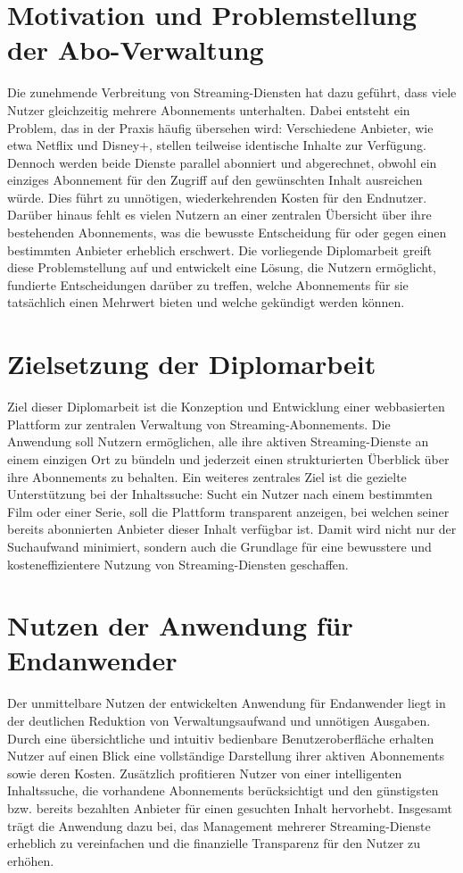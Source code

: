 \section{Motivation und Problemstellung der Abo-Verwaltung}

Die zunehmende Verbreitung von Streaming-Diensten hat dazu geführt, dass viele Nutzer gleichzeitig mehrere Abonnements unterhalten. Dabei entsteht ein Problem, das in der Praxis häufig übersehen wird: Verschiedene Anbieter, wie etwa Netflix und Disney+, stellen teilweise identische Inhalte zur Verfügung. Dennoch werden beide Dienste parallel abonniert und abgerechnet, obwohl ein einziges Abonnement für den Zugriff auf den gewünschten Inhalt ausreichen würde. Dies führt zu unnötigen, wiederkehrenden Kosten für den Endnutzer.
Darüber hinaus fehlt es vielen Nutzern an einer zentralen Übersicht über ihre bestehenden Abonnements, was die bewusste Entscheidung für oder gegen einen bestimmten Anbieter erheblich erschwert. Die vorliegende Diplomarbeit greift diese Problemstellung auf und entwickelt eine Lösung, die Nutzern ermöglicht, fundierte Entscheidungen darüber zu treffen, welche Abonnements für sie tatsächlich einen Mehrwert bieten und welche gekündigt werden können.

\section{Zielsetzung der Diplomarbeit}
Ziel dieser Diplomarbeit ist die Konzeption und Entwicklung einer webbasierten Plattform zur zentralen Verwaltung von Streaming-Abonnements. Die Anwendung soll Nutzern ermöglichen, alle ihre aktiven Streaming-Dienste an einem einzigen Ort zu bündeln und jederzeit einen strukturierten Überblick über ihre Abonnements zu behalten.
Ein weiteres zentrales Ziel ist die gezielte Unterstützung bei der Inhaltssuche: Sucht ein Nutzer nach einem bestimmten Film oder einer Serie, soll die Plattform transparent anzeigen, bei welchen seiner bereits abonnierten Anbieter dieser Inhalt verfügbar ist. Damit wird nicht nur der Suchaufwand minimiert, sondern auch die Grundlage für eine bewusstere und kosteneffizientere Nutzung von Streaming-Diensten geschaffen.

\section{Nutzen der Anwendung für Endanwender}
Der unmittelbare Nutzen der entwickelten Anwendung für Endanwender liegt in der deutlichen Reduktion von Verwaltungsaufwand und unnötigen Ausgaben. Durch eine übersichtliche und intuitiv bedienbare Benutzeroberfläche erhalten Nutzer auf einen Blick eine vollständige Darstellung ihrer aktiven Abonnements sowie deren Kosten.
Zusätzlich profitieren Nutzer von einer intelligenten Inhaltssuche, die vorhandene Abonnements berücksichtigt und den günstigsten bzw. bereits bezahlten Anbieter für einen gesuchten Inhalt hervorhebt. Insgesamt trägt die Anwendung dazu bei, das Management mehrerer Streaming-Dienste erheblich zu vereinfachen und die finanzielle Transparenz für den Nutzer zu erhöhen.

